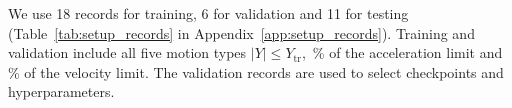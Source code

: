 We use 18 records for training, 6 for validation and 11 for testing
(Table~\ref{tab:setup_records} in Appendix~\ref{app:setup_records}).
%
Training and validation include all five motion types
$\lvert Y\rvert\le Y_{\mathrm{tr}}$, \SetupTrainAcc\,\% of the
acceleration limit and \SetupTrainVel\,\% of the velocity limit.
The validation records are used to select checkpoints
and hyperparameters.

